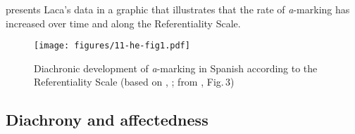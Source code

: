 \documentclass[output=paper]{LSP/langsci}
\begin{document}
\begin{table}
\caption{Diachronic development of a-marking in Spanish according to the Referentiality Scale (selection from Table~3 of \citealt{Laca2006Objeto}: 442). I replaced the original abbreviations in the following way: NPrHum: human proper name, HumDef–Pro: human definite NP, HumInd–Pro: human indefinite NP, Hum0: human bare noun}\label{11-he-tab:1}
\end{table}

 presents Laca’s data in a graphic that illustrates that the rate of \textit{a}-marking has increased over time and along the Referentiality Scale.

\begin{figure}
	\centering
	\texttt{[image: figures/11-he-fig1.pdf]}
\caption{Diachronic development of \textit{a}-marking in Spanish according to the Referentiality Scale (based on \citealt[442]{Laca2006Objeto}, ; from \citealt{vonHeusingeretal2011Affectedness}, Fig.\,3)} \label{11-he-fig:1}
\end{figure}


\subsection{Diachrony and affectedness}\label{11-subsec:2-3}
\end{document}
